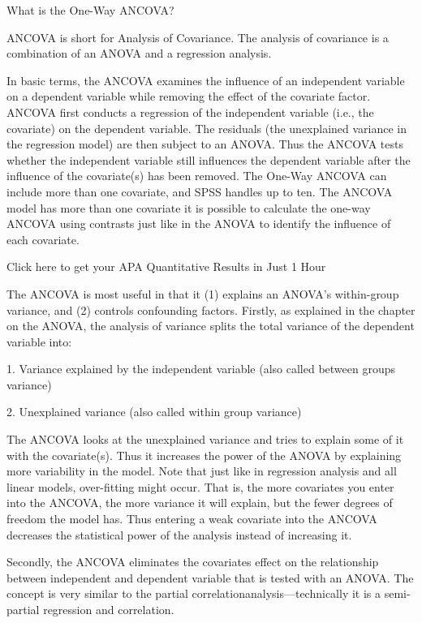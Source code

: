 What is the One-Way ANCOVA?

ANCOVA is short for Analysis of Covariance.  The analysis of covariance is a combination of an ANOVA and a regression analysis.

In basic terms, the ANCOVA examines the influence of an independent variable on a dependent variable while removing the effect of the covariate factor.  ANCOVA first conducts a regression of the independent variable (i.e., the covariate) on the dependent variable.  The residuals (the unexplained variance in the regression model) are then subject to an ANOVA.  Thus the ANCOVA tests whether the independent variable still influences the dependent variable after the influence of the covariate(s) has been removed.  The One-Way ANCOVA can include more than one covariate, and SPSS handles up to ten.  The ANCOVA model has more than one covariate it is possible to calculate the one-way ANCOVA using contrasts just like in the ANOVA to identify the influence of each covariate.

Click here to get your APA Quantitative Results in Just 1 Hour

The ANCOVA is most useful in that it (1) explains an ANOVA's within-group variance, and (2) controls confounding factors.  Firstly, as explained in the chapter on the ANOVA, the analysis of variance splits the total variance of the dependent variable into:

1.       Variance explained by the independent variable (also called between groups variance)

2.       Unexplained variance (also called within group variance)

The ANCOVA looks at the unexplained variance and tries to explain some of it with the covariate(s).  Thus it increases the power of the ANOVA by explaining more variability in the model.
Note that just like in regression analysis and all linear models, over-fitting might occur.  That is, the more covariates you enter into the ANCOVA, the more variance it will explain, but the fewer degrees of freedom the model has.  Thus entering a weak covariate into the ANCOVA decreases the statistical power of the analysis instead of increasing it.

Secondly, the ANCOVA eliminates the covariates effect on the relationship between independent and dependent variable that is tested with an ANOVA.  The concept is very similar to the partial correlationanalysis—technically it is a semi-partial regression and correlation.

